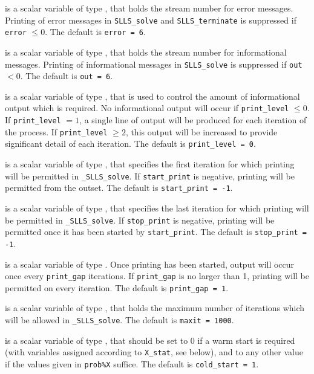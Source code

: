 \documentclass{galahad}
\newcommand{\packagename}{SLLS}
\newcommand{\fullpackagename}{\libraryname\_\packagename}
\newcommand{\solver}{{\tt \fullpackagename\_solve}}
\begin{document}
\begin{description}

 is a scalar variable of type \integer, that holds the
stream number for error messages. Printing of error messages in
{\tt \packagename\_solve} and {\tt \packagename\_terminate}
is suppressed if {\tt error} $\leq 0$.
The default is {\tt error = 6}.

 is a scalar variable of type \integer, that holds the
stream number for informational messages. Printing of informational messages in
{\tt \packagename\_solve} is suppressed if {\tt out} $< 0$.
The default is {\tt out = 6}.

 is a scalar variable of type \integer, that is used
to control the amount of informational output which is required. No
informational output will occur if {\tt print\_level} $\leq 0$. If
{\tt print\_level} $= 1$, a single line of output will be produced for each
iteration of the process. If {\tt print\_level} $\geq 2$, this output will be
increased to provide significant detail of each iteration.
The default is {\tt print\_level = 0}.

 is a scalar variable of type \integer, that specifies
the first iteration for which printing will be permitted in \solver.
If {\tt start\_print} is negative, printing will be permitted from the outset.
The default is {\tt start\_print = -1}.

 is a scalar variable of type \integer, that specifies
the last iteration for which printing will be permitted in  \solver.
If {\tt stop\_print} is negative, printing will be permitted once it has been
started by {\tt start\_print}.
The default is {\tt stop\_print = -1}.

 is a scalar variable of type \integer.
Once printing has been started, output will occur once every
{\tt print\_gap} iterations. If {\tt print\_gap} is no larger than 1,
printing will be permitted on every iteration.
The default is {\tt print\_gap = 1}.

 is a scalar variable of type \integer, that holds the
maximum number of iterations which will be allowed in \solver.
The default is {\tt maxit = 1000}.

 is a scalar variable of type \integer, that
should be set to 0 if a warm start is required (with variables
assigned according to {\tt X\_stat}, see below), and to any other value if the
values given in {\tt prob\%X} suffice.
The default is {\tt cold\_start = 1}.


\end{description}
\end{document}
